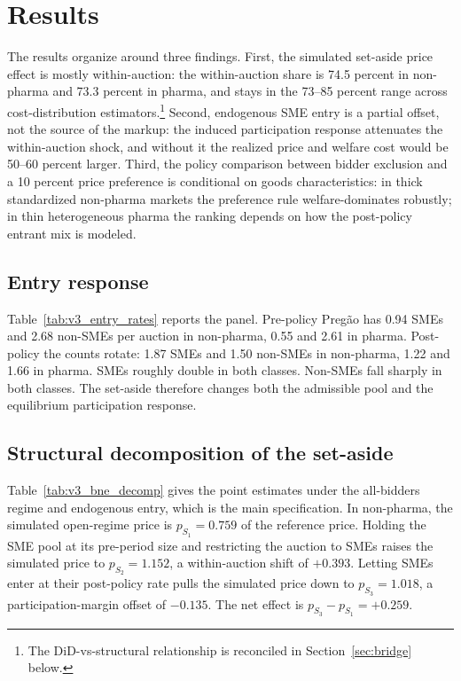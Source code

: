 \section{Results}\label{sec:results}

The results organize around three findings. First, the simulated set-aside price effect is mostly within-auction: the within-auction share is 74.5 percent in non-pharma and 73.3 percent in pharma, and stays in the 73--85 percent range across cost-distribution estimators.\footnote{The DiD-vs-structural relationship is reconciled in Section~\ref{sec:bridge} below.} Second, endogenous SME entry is a partial offset, not the source of the markup: the induced participation response attenuates the within-auction shock, and without it the realized price and welfare cost would be 50--60 percent larger. Third, the policy comparison between bidder exclusion and a 10 percent price preference is conditional on goods characteristics: in thick standardized non-pharma markets the preference rule welfare-dominates robustly; in thin heterogeneous pharma the ranking depends on how the post-policy entrant mix is modeled.

\subsection{Entry response}

Table~\ref{tab:v3_entry_rates} reports the panel. Pre-policy Preg\~ao has 0.94 SMEs and 2.68 non-SMEs per auction in non-pharma, 0.55 and 2.61 in pharma. Post-policy the counts rotate: 1.87 SMEs and 1.50 non-SMEs in non-pharma, 1.22 and 1.66 in pharma. SMEs roughly double in both classes. Non-SMEs fall sharply in both classes. The set-aside therefore changes both the admissible pool and the equilibrium participation response.

\subsection{Structural decomposition of the set-aside}

Table~\ref{tab:v3_bne_decomp} gives the point estimates under the all-bidders regime and endogenous entry, which is the main specification. In non-pharma, the simulated open-regime price is $p_{S_1} = 0.759$ of the reference price. Holding the SME pool at its pre-period size and restricting the auction to SMEs raises the simulated price to $p_{S_2} = 1.152$, a within-auction shift of $+0.393$. Letting SMEs enter at their post-policy rate pulls the simulated price down to $p_{S_3} = 1.018$, a participation-margin offset of $-0.135$. The net effect is $p_{S_3} - p_{S_1} = +0.259$.

